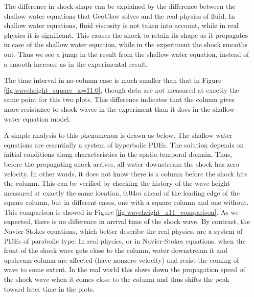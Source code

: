 \documentclass[11pt]{article}
\begin{document}
The difference in shock shape can be explained by the difference between the shallow water equations that GeoClaw solves and the real physics of fluid. 
In shallow water equations, fluid viscosity is not taken into account, while in real physics it is significant.
This causes the shock to retain its shape as it propagates in case of the shallow water equation, while in the experiment the shock smooths out.
Thus we see a jump in the result from the shallow water equation, instead of a smooth increase as in the experimental result.
\par
The time interval in no-column case is much smaller than that in Figure \ref{fig:waveheight_square_x=11.0}, though data are not measured at exactly the same point for this two plots. 
This difference indicates that the column gives more resistance to shock waves in the experiment than it does in the shallow water equation model. 
\par
A simple analysis to this phenomenon is drawn as below.
The shallow water equations are essentially a system of hyperbolic PDEs. The solution depends on initial conditions along characteristics in the spatio-temporal domain. 
Thus, before the propagating shock arrives, all water downstream the shock has zero velocity. 
In other words, it does not know there is a column before the shock hits the column.
This can be verified by checking the history of the wave height measured at exactly the same location, $0.04m$ ahead of the leading edge of the square column, but in different cases, one with a square column and one without.
This comparison is showed in Figure \ref{fig:waveheight_x11_comparison}. As we expected, there is no difference in arrival time of the shock wave.
By contrast, the Navier-Stokes equations, which better describe the real physics, are a system of PDEs of parabolic type. 
In real physics, or in Navier-Stokes equations, when the front of the shock wave gets close to the column, water downstream it and upstream column are affected (have nonzero velocity) and resist the coming of wave to some extent. 
In the real world this slows down the propagation speed of the shock wave when it comes close to the column and thus shifts the peak toward later time in the plots.
\end{document}
